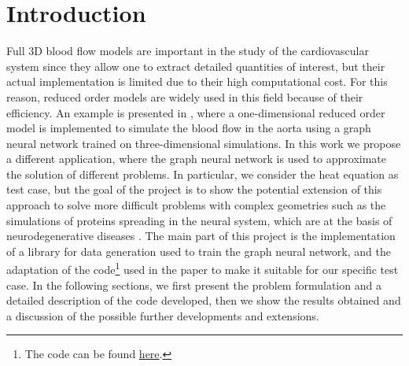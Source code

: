 \documentclass[11pt,a4paper]{article}
\begin{document}




\section{Introduction}
Full 3D blood flow models are important in the study of the cardiovascular system since they allow one to extract detailed quantities of interest, but their actual implementation is limited due to their high computational cost. For this reason, reduced order models are widely used in this field because of their efficiency. An example is presented in \cite{Luca}, where a one-dimensional reduced order model is implemented to simulate the blood flow in the aorta using a graph neural network trained on three-dimensional simulations. In this work we propose a different application, where the graph neural network is used to approximate the solution of different problems. In particular, we consider the heat equation as test case, but the goal of the project is to show the potential extension of this approach to solve more difficult problems with complex geometries such as the simulations of proteins spreading in the neural system, which are at the basis of neurodegenerative diseases \cite{MattiaCorti}. The main part of this project is the implementation of a library for data generation used to train the graph neural network, and the adaptation of the code\footnote{The code can be found \href{https://github.com/StanfordCBCL/gROM}{here}.} used in the paper\cite{Luca} to make it suitable for our specific test case. In the following sections, we first present the problem formulation and a detailed description of the code developed, then we show the results obtained and a discussion of the possible further developments and extensions.

\end{document}
